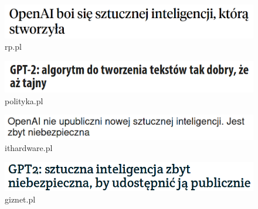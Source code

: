 \documentclass{beamer}
\begin{document}
\begin{frame}
    \begin{figure}
        \includegraphics[scale=0.8]{img/gpt2_pl1.png}
    	\caption{rp.pl}
    \end{figure}
    \begin{figure}
       	\includegraphics[scale=0.8]{img/gpt2_pl2.png}
    	\caption{polityka.pl}
    \end{figure}
    \begin{figure}
       	\includegraphics[scale=0.8]{img/gpt2_pl3.png}
    	\caption{ithardware.pl}
    \end{figure}
    \begin{figure}
       	\includegraphics[scale=0.8]{img/gpt2_pl4.png}
    	\caption{giznet.pl}
    \end{figure}
\end{frame}
\end{document}
